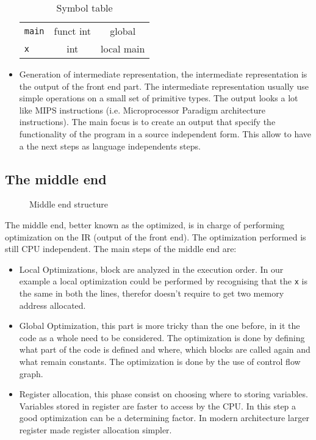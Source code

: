 \documentclass[../main.tex]{subfiles}
\begin{document}
\begin{itemize}
\begin{table}[ht]
\begin{tabular}[t]{lcc}
        \hline
        \texttt{main}&funct int&global\\
        \texttt{x}&int &local main\\
        \hline
        \end{tabular}
        \caption{Symbol table}
        \end{table}%
    \item Generation of intermediate representation, the intermediate representation is the output of the front end part. The intermediate representation usually use simple operations on a small set of primitive types. The output looks a lot like MIPS instructions (i.e. Microprocessor Paradigm architecture instructions). The main focus is to create an output that specify the functionality of the program in a source independent form. This allow to have a the next steps as language independents steps. 
\end{itemize}
\subsection{The middle end}
\begin{figure}[h]
  \centering
{}
  \caption{Middle end structure}
\end{figure}
The middle end, better known as the optimized, is in charge of performing optimization on the IR (output of the front end). The optimization performed is still CPU independent. The main steps of the middle end are:
\begin{itemize}
    \item Local Optimizations, block are analyzed in the execution order. In our example a local optimization could be performed by recognising that the \texttt{x} is the same in both the lines, therefor doesn't require to get two memory address allocated. 
    \item Global Optimization, this part is more tricky than the one before, in it the code as a whole need to be considered. The optimization is done by defining what part of the code is defined and where, which blocks are called again and what remain constants. The optimization is done by the use of control flow graph. 
    \item Register allocation, this phase consist on choosing where to storing variables. Variables stored in register are faster to access by the CPU. In this step a good optimization can be a determining factor. In modern architecture larger register made register allocation simpler. 
\end{itemize}
\end{document}
